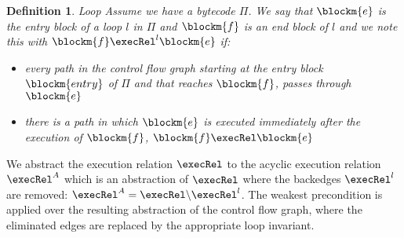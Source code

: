 

\newtheorem{defin}{Definition}
\begin{defin}
{Loop}
\label{defLoop}
Assume we have a bytecode $\Pi$. We say that $\blockm{e}$ is the entry block of a loop $l$ in $\Pi$ and $\blockm{f}$ is an end block of $l$ and we note this with  
 $\blockm{f} \execRel^l \blockm{e}$ if:
\begin{itemize}
\item every path in the control flow graph starting at the entry block $\blockm{entry}$ of $\Pi$ and that reaches $\blockm{f}$, passes through  $\blockm{e}$ 
\item   there is a path in which $\blockm{e}$  is executed immediately after the execution of $\blockm{f}$,  $\blockm{f} \execRel \blockm{e}$

\end{itemize}
\end{defin}

We abstract the execution relation $\execRel$ to the acyclic execution relation $\execRel^A$ which is an abstraction of $\execRel$ where the backedges $ \execRel^l$ are removed: $\execRel^A = \execRel \backslash \execRel^l$. The weakest precondition is applied over the resulting abstraction of the control
flow graph, where the eliminated edges are replaced by the appropriate loop invariant.



